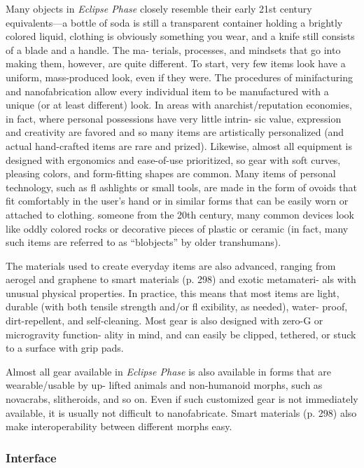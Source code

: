 Many objects in \textit{Eclipse Phase} closely resemble their 
early 21st century equivalents—a bottle of soda is still 
a transparent container holding a brightly colored 
liquid, clothing is obviously something you wear, and 
a knife still consists of a blade and a handle. The ma-
terials, processes, and mindsets that go into making 
them, however, are quite different. To start, very few 
items look have a uniform, mass-produced look, even 
if they were. The procedures of minifacturing and 
nanofabrication allow every individual item to be 
manufactured with a unique (or at least different) 
look. In areas with anarchist/reputation economies, in 
fact, where personal possessions have very little intrin-
sic value, expression and creativity are favored and so 
many items are artistically personalized (and actual 
hand-crafted items are rare and prized). Likewise, 
almost all equipment is designed with ergonomics 
and ease-of-use prioritized, so gear with soft curves, 
pleasing colors, and form-fitting shapes are common. 
Many items of personal technology, such as fl ashlights 
or small tools, are made in the form of ovoids that 
fit comfortably in the user's hand or in similar forms 
that can be easily worn or attached to clothing.
someone from the 20th century, many common 
devices look like oddly colored rocks or decorative 
pieces of plastic or ceramic (in fact, many such items 
are referred to as ``blobjects'' by older transhumans).

The materials used to create everyday items are 
also advanced, ranging from aerogel and graphene 
to smart materials (p. 298) and exotic metamateri-
als with unusual physical properties. In practice, this 
means that most items are light, durable (with both 
tensile strength and/or fl exibility, as needed), water-
proof, dirt-repellent, and self-cleaning. Most gear is 
also designed with zero-G or microgravity function-
ality in mind, and can easily be clipped, tethered, or 
stuck to a surface with grip pads.

Almost all gear available in \textit{Eclipse Phase} is also 
available in forms that are wearable/usable by up-
lifted animals and non-humanoid morphs, such 
as novacrabs, slitheroids, and so on. Even if such 
customized gear is not immediately available, it is 
usually not difficult to nanofabricate. Smart materials 
(p. 298) also make interoperability between different 
morphs easy.

\subsubsection{Interface}


